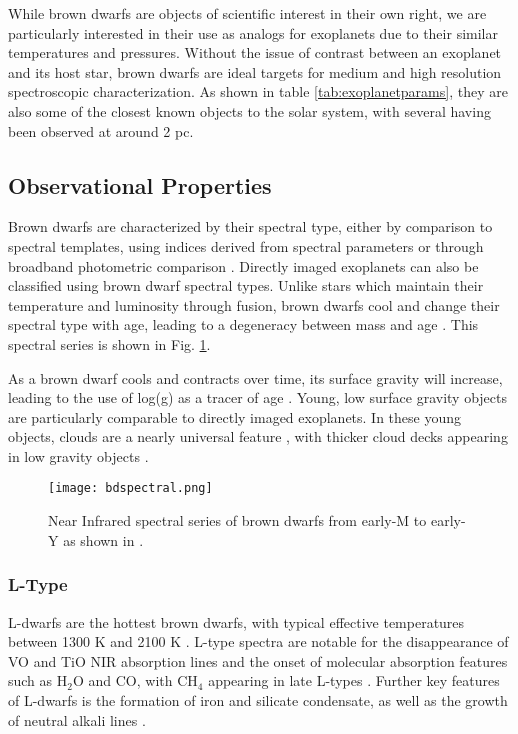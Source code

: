 While brown dwarfs are objects of scientific interest in their own right, we are particularly interested in their use as analogs for exoplanets due to their similar temperatures and pressures.
Without the issue of contrast between an exoplanet and its host star, brown dwarfs are ideal targets for medium and high resolution spectroscopic characterization.
As shown in table \ref{tab:exoplanetparams}, they are also some of the closest known objects to the solar system, with several having been observed at around 2 pc.

\subsection{Observational Properties}
Brown dwarfs are characterized by their spectral type, either by comparison to spectral templates, using indices derived from spectral parameters or through broadband photometric comparison \parencite{Helling2014}.
Directly imaged exoplanets can also be classified using brown dwarf spectral types.
Unlike stars which maintain their temperature and luminosity through fusion, brown dwarfs cool and change their spectral type with age, leading to a degeneracy between mass and age \parencite{Burrows2001}.
This spectral series is shown in Fig. \ref{fig:bdspec}.

As a brown dwarf cools and contracts over time, its surface gravity will increase, leading to the use of log(g) as a tracer of age \parencite{Manjavacas2014}.
Young, low surface gravity objects are particularly comparable to directly imaged exoplanets.
In these young objects, clouds are a nearly universal feature \parencite{Cooper2003,Helling2014}, with thicker cloud decks appearing in low gravity objects \parencite{Helling2014}.

\begin{figure}[t]
	\texttt{[image: bdspectral.png]}
	\caption[Brown Dwarf Spectra]{Near Infrared spectral series of brown dwarfs from early-M to early-Y as shown in \parencite{Helling2014}.}
	\label{fig:bdspec}
\end{figure}

\subsubsection{L-Type}
L-dwarfs are the hottest brown dwarfs, with typical effective temperatures between 1300 K and 2100 K \parencite{Burrows2001}.
L-type spectra are notable for the disappearance of VO and TiO NIR absorption lines and the onset of molecular absorption features such as H$_{2}$O and CO, with CH$_{4}$ appearing in late L-types \parencite{Manjavacas2014}.
Further key features of L-dwarfs is the formation of iron and silicate condensate, as well as the growth of neutral alkali lines \parencite{Burrows2001}.
